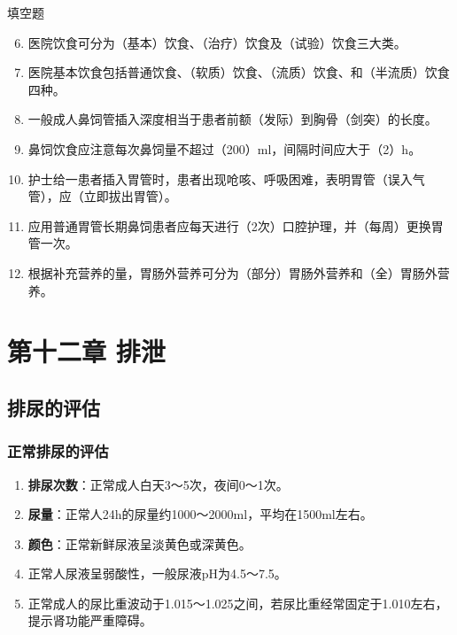 \documentclass[11pt, a4paper]{ctexart}
\begin{document}
\begin{tipsbox}{填空题}
\begin{enumerate}
    \setcounter{enumi}{5}
    \item 医院饮食可分为（基本）饮食、（治疗）饮食及（试验）饮食三大类。
    \item 医院基本饮食包括普通饮食、（软质）饮食、（流质）饮食、和（半流质）饮食四种。
    \item 一般成人鼻饲管插入深度相当于患者前额（发际）到胸骨（剑突）的长度。
    \item 鼻饲饮食应注意每次鼻饲量不超过（200）ml，间隔时间应大于（2）h。
    \item 护士给一患者插入胃管时，患者出现呛咳、呼吸困难，表明胃管（误入气管），应（立即拔出胃管）。
    \item 应用普通胃管长期鼻饲患者应每天进行（2次）口腔护理，并（每周）更换胃管一次。
    \item 根据补充营养的量，胃肠外营养可分为（部分）胃肠外营养和（全）胃肠外营养。
\end{enumerate}
\end{tipsbox}

\section{第十二章 排泄}
\subsection{排尿的评估}
\subsubsection{正常排尿的评估}
\begin{enumerate}
    \item \textbf{排尿次数}：正常成人白天3～5次，夜间0～1次。
    \item \textbf{尿量}：正常人24h的尿量约1000～2000ml，平均在1500ml左右。
    \item \textbf{颜色}：正常新鲜尿液呈淡黄色或深黄色。
    \item 正常人尿液呈弱酸性，一般尿液pH为4.5～7.5。
    \item 正常成人的尿比重波动于1.015～1.025之间，若尿比重经常固定于1.010左右，提示肾功能严重障碍。
\end{enumerate}
\end{document}
